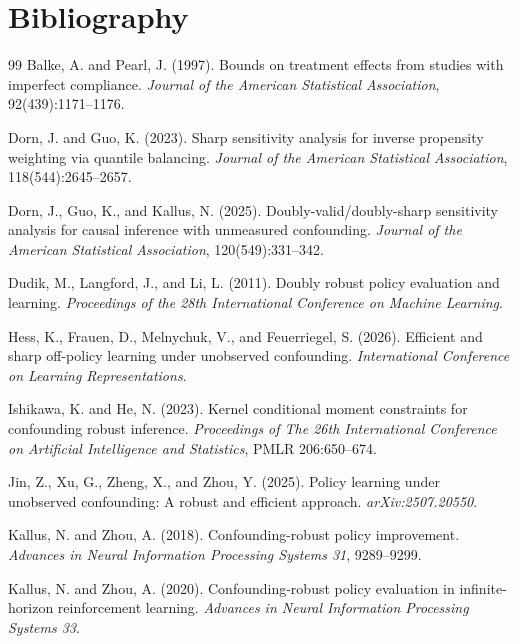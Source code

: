 \documentclass[11pt]{article}
\theoremstyle{definition}
\theoremstyle{plain}
\theoremstyle{remark}
\begin{document}
\section*{Bibliography}
\begin{thebibliography}{99}
Balke, A. and Pearl, J. (1997).
Bounds on treatment effects from studies with imperfect compliance.
\emph{Journal of the American Statistical Association}, 92(439):1171--1176.

Dorn, J. and Guo, K. (2023).
Sharp sensitivity analysis for inverse propensity weighting via quantile balancing.
\emph{Journal of the American Statistical Association}, 118(544):2645--2657.

Dorn, J., Guo, K., and Kallus, N. (2025).
Doubly-valid/doubly-sharp sensitivity analysis for causal inference with unmeasured confounding.
\emph{Journal of the American Statistical Association}, 120(549):331--342.

Dudik, M., Langford, J., and Li, L. (2011).
Doubly robust policy evaluation and learning.
\emph{Proceedings of the 28th International Conference on Machine Learning}.

Hess, K., Frauen, D., Melnychuk, V., and Feuerriegel, S. (2026).
Efficient and sharp off-policy learning under unobserved confounding.
\emph{International Conference on Learning Representations}.

Ishikawa, K. and He, N. (2023).
Kernel conditional moment constraints for confounding robust inference.
\emph{Proceedings of The 26th International Conference on Artificial Intelligence and Statistics}, PMLR 206:650--674.

Jin, Z., Xu, G., Zheng, X., and Zhou, Y. (2025).
Policy learning under unobserved confounding: A robust and efficient approach.
\emph{arXiv:2507.20550}.

Kallus, N. and Zhou, A. (2018).
Confounding-robust policy improvement.
\emph{Advances in Neural Information Processing Systems 31}, 9289--9299.

Kallus, N. and Zhou, A. (2020).
Confounding-robust policy evaluation in infinite-horizon reinforcement learning.
\emph{Advances in Neural Information Processing Systems 33}.


\end{thebibliography}
\end{document}
